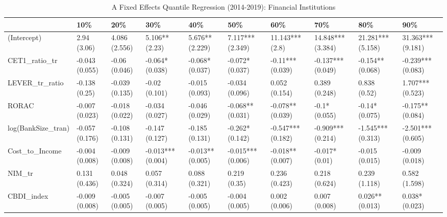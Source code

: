 \begin{table}[ht]
\centering
\caption{A Fixed Effects Quantile Regression (2014-2019): Financial Institutions} 
\begingroup\small
\begin{tabular}{llllllllll}
  \toprule
 & 10\% & 20\% & 30\% & 40\% & 50\% & 60\% & 70\% & 80\% & 90\% \\ 
  \midrule
(Intercept) & 2.94 (3.06) & 4.086 (2.556) & 5.106** (2.23) & 5.676** (2.229) & 7.117*** (2.349) & 11.143*** (2.8) & 14.848*** (3.384) & 21.281*** (5.158) & 31.363*** (9.181) \\ 
  CET1\_ratio\_tr & -0.043 (0.055) & -0.06 (0.046) & -0.064* (0.038) & -0.068* (0.037) & -0.072* (0.037) & -0.11*** (0.039) & -0.137*** (0.049) & -0.154** (0.068) & -0.239*** (0.083) \\ 
  LEVER\_tr\_ratio & -0.138 (0.25) & -0.039 (0.135) & -0.02 (0.101) & -0.015 (0.093) & -0.034 (0.096) & 0.052 (0.154) & 0.389 (0.248) & 0.838 (0.52) & 1.707*** (0.523) \\ 
  RORAC & -0.007 (0.023) & -0.018 (0.022) & -0.034 (0.027) & -0.046 (0.029) & -0.068** (0.031) & -0.078** (0.039) & -0.1* (0.055) & -0.14* (0.075) & -0.175** (0.084) \\ 
  log(BankSize\_tran) & -0.057 (0.176) & -0.108 (0.131) & -0.147 (0.127) & -0.185 (0.131) & -0.262* (0.142) & -0.547*** (0.182) & -0.909*** (0.214) & -1.545*** (0.313) & -2.501*** (0.605) \\ 
  Cost\_to\_Income & -0.004 (0.008) & -0.009 (0.008) & -0.013*** (0.004) & -0.013** (0.005) & -0.015*** (0.006) & -0.018** (0.007) & -0.017* (0.01) & -0.015 (0.015) & -0.009 (0.018) \\ 
  NIM\_tr & 0.131 (0.436) & 0.048 (0.324) & 0.057 (0.314) & 0.088 (0.321) & 0.219 (0.35) & 0.236 (0.423) & 0.218 (0.624) & 0.239 (1.118) & 0.582 (1.598) \\ 
  CBDI\_index & -0.009 (0.008) & -0.005 (0.005) & -0.007 (0.005) & -0.005 (0.005) & -0.004 (0.005) & 0.002 (0.006) & 0.007 (0.008) & 0.026** (0.013) & 0.038* (0.023) \\ 
   \bottomrule
\end{tabular}
\endgroup
\end{table}

